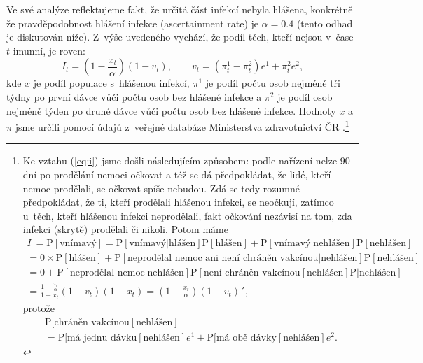 Ve své analýze reflektujeme fakt, že určitá část infekcí nebyla
hlášena, konkrétně že pravděpodobnost hlášení infekce (ascertainment
rate) je $\alpha=0.4$ (tento odhad je diskutován níže). Z~výše uvedeného vychází,
že podíl těch, kteří nejsou v~čase $t$ imunní, je roven:
\begin{equation}
I_{t}=\left(1-\frac{x_{t}}{\alpha}\right)\left(1-v_{t}\right),\qquad v_{t}=(\pi_{t}^{1}-\pi_{t}^{2})e^{1}+\pi_{t}^{2}e^{2},\label{eq:i}
\end{equation}
kde $x$ je podíl populace s~hlášenou infekcí, $\pi^{1}$ je podíl počtu osob nejméně tři týdny po první dávce vůči počtu osob bez hlášené infekce a $\pi^{2}$ je podíl osob
nejméně týden po druhé dávce vůči počtu osob bez hlášené infekce. Hodnoty $x$ a $\pi$ jsme určili pomocí údajů z~veřejné databáze Ministerstva
zdravotnictví ČR \cite{mzcrdata}.\footnote{Ke vztahu (\ref{eq:i}) jsme došli následujícím způsobem: podle nařízení \cite{covidportalspec} nelze 90 dní po prodělání nemoci očkovat a též se dá předpokládat, že lidé, kteří nemoc prodělali, se očkovat spíše nebudou. Zdá se tedy rozumné předpokládat, že ti, kteří prodělali hlášenou infekci, se neočkují, zatímco u~těch, kteří hlášenou infekci neprodělali, fakt očkování nezávisí na tom, zda infekci (skrytě) prodělali či nikoli. Potom máme 
\begin{multline*}
I~= \mathrm{P}[\text{vnímavý}]= \mathrm{P}[\text{vnímavý}|\text{hlášen}]\mathrm{P}[\text{hlášen}]
+\mathrm{P}[\text{vnímavý}|\text{nehlášen}]\mathrm{P}[\text{nehlášen}]
\\
= 0 \times \mathrm{P}[\text{hlášen}] 
+ \mathrm{P}[\text{neprodělal nemoc ani není chráněn vakcínou}|\text{nehlášen}]\mathrm{P}[\text{nehlášen}]
\\
= 0+\mathrm{P}[\text{neprodělal nemoc}|\text{nehlášen}]\mathrm{P}[\text{není chráněn vakcínou}[\text{nehlášen}]\mathrm{P}|\text{nehlášen}]
\\
= \frac{1-\frac{x_{t}}{\alpha}}{1-x_t}\left(1-v_{t}\right)(1-x_t)=\left(1-\frac{x_{t}}{\alpha}\right)\left(1-v_{t}\right)´,
\end{multline*}
protože
\begin{multline*}
\mathrm{P}[\text{chráněn vakcínou}[\text{nehlášen}]\\=\mathrm{P}[\text{má jednu dávku}[\text{nehlášen}]e^1+\mathrm{P}[\text{má obě dávky}[\text{nehlášen}] e^2.
\end{multline*}
}

